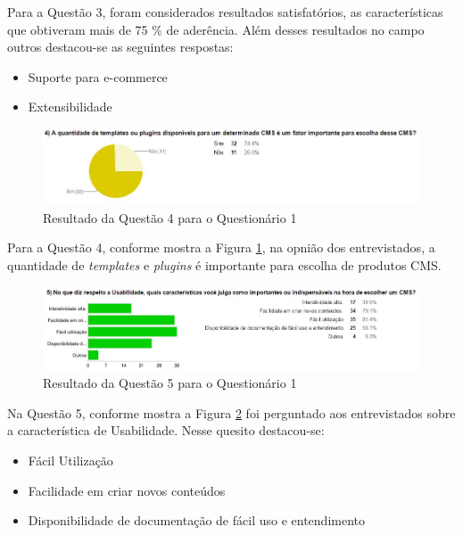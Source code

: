Para a Questão 3, foram considerados resultados satisfatórios, as características que obtiveram mais de 75 \% de aderência. Além desses resultados no campo outros destacou-se as seguintes respostas: 
 \begin{itemize}

   \item Suporte para e-commerce
    \item Extensibilidade
    
    \end{itemize}
    



\begin{figure}[!tbh]
\centering
\includegraphics[keepaspectratio=true,scale=0.75]{figuras/Ques_1/q4.jpg}
\caption{Resultado da Questão 4 para o Questionário 1 }
\label{Q4_Q4}
\end{figure}

Para a Questão 4, conforme mostra a Figura \ref{Q4_Q4}, na opnião dos entrevistados, a quantidade de \textit{templates} e \textit{plugins} é importante para escolha de produtos CMS. 


\begin{figure}[!th]
\centering
\includegraphics[keepaspectratio=true,scale=0.6]{figuras/Ques_1/q5.jpg}
\caption{Resultado da Questão 5 para o Questionário 1 }
\label{Q5_Q5}
\end{figure}

Na Questão 5, conforme mostra a Figura \ref{Q5_Q5} foi perguntado aos entrevistados sobre a característica de Usabilidade. Nesse quesito destacou-se:

 \begin{itemize}
    \item Fácil Utilização
    \item Facilidade em criar novos conteúdos
    \item Disponibilidade de documentação de fácil uso e entendimento
        
    \end{itemize}

